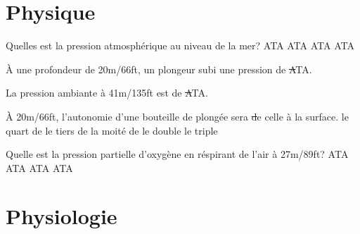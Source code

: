 \documentclass[english,10pt,a4paper,twoside]{article}
\begin{document}
\section{Physique}
	\begin{outline}
		\1 Quelles est la pression atmosphérique au niveau de la mer?
			 ATA
			 ATA
			 ATA
			 ATA

		\1 À une profondeur de 20m/66ft, un plongeur subi une pression de \st ATA.

		\1 La pression ambiante à 41m/135ft est de \st ATA.

		\1 À 20m/66ft, l'autonomie d'une bouteille de plongée sera \st de celle à la surface.
			\2 le quart de
			\2 le tiers de
			\2 la moité de
			\2 le double
			\2 le triple

		\1 Quelle est la pression partielle d'oxygène en réspirant de l'air à 27m/89ft?
			 ATA
			 ATA
			 ATA
			 ATA
	\end{outline}
	\vfill
	\pagebreak

	\section{Physiologie}
\end{document}
